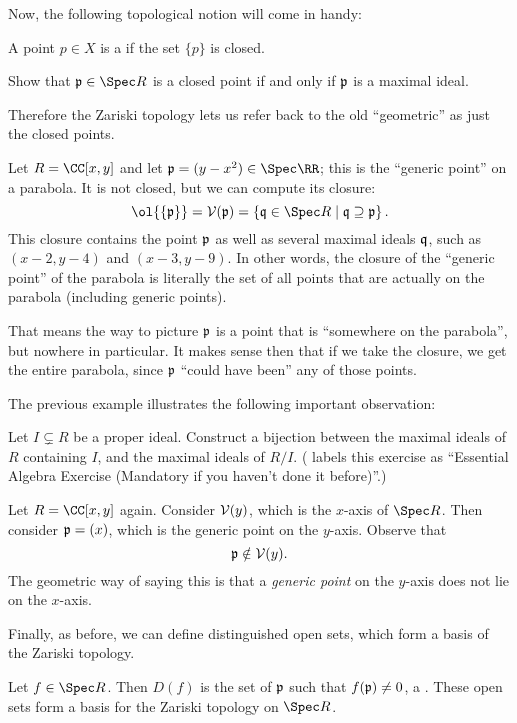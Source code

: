 Now, the following topological notion will come in handy:
\begin{definition}
	A point $p \in X$ is a  if the set $\{p\}$ is closed.
\end{definition}
\begin{ques}
	Show that $\pp \in \Spec R$ is a closed point
	if and only if $\mathfrak p$ is a maximal ideal.
\end{ques}
Therefore the Zariski topology lets us refer back to the old ``geometric''
as just the closed points.
\begin{example}
	Let $R = \CC[x,y]$ and let $\pp = (y-x^2) \in \Spec \RR$;
	this is the ``generic point'' on a parabola.
	It is not closed, but we can compute its closure:
	\[
		\ol{\{\pp\}}
		= \VV(\pp) = \left\{ \qq \in \Spec R \mid \qq \supseteq \pp \right\}.
	\]
	This closure contains the point $\mathfrak p$ as well
	as several maximal ideals $\mathfrak q$, such as $(x-2,y-4)$ and $(x-3,y-9)$.
	In other words, the closure of the ``generic point'' of the parabola
	is literally the set of all points that are actually on the parabola
	(including generic points).

	That means the way to picture $\mathfrak p$ is a point that 
	is ``somewhere on the parabola'', but nowhere in particular.
	It makes sense then that if we take the closure,
	we get the entire parabola,
	since $\mathfrak p$ ``could have been'' any of those points.
\end{example}
The previous example illustrates the following important observation:
\begin{exercise}
	Let $I \subsetneq R$ be a proper ideal.
	Construct a bijection between the maximal ideals of $R$ containing $I$,
	and the maximal ideals of $R/I$.
	(\cite{ref:vakil} labels this exercise as
	``Essential Algebra Exercise (Mandatory if you haven't done it before)''.)
\end{exercise}

\begin{example}
	Let $R = \CC[x,y]$ again.
	Consider $\mathcal V(y)$, which is the $x$-axis of $\Spec R$.
	Then consider $\mathfrak p = (x)$, which is the generic point on the $y$-axis.
	Observe that
	\[ \mathfrak p \notin \mathcal V(y). \]
	The geometric way of saying this is that a \emph{generic point}
	on the $y$-axis does not lie on the $x$-axis.
\end{example}

Finally, as before, we can define distinguished open sets,
which form a basis of the Zariski topology.
\begin{definition}
	Let $f \in \Spec R$.
	Then $D(f)$ is the set of $\mathfrak p$ such that $f(\mathfrak p) \neq 0$,
	a .
	These open sets form a basis for the Zariski topology on $\Spec R$.
\end{definition}

